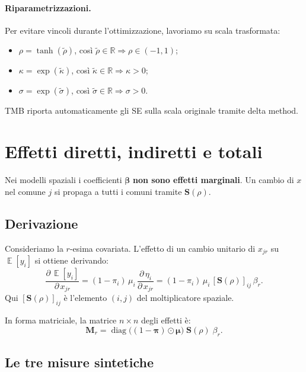 \documentclass[12pt,a4paper]{article}
\newcommand{\bS}{\mathbf{S}}
\DeclareMathOperator{\E}{\mathbb{E}}
\DeclareMathOperator{\diag}{diag}
\begin{document}
\paragraph{Riparametrizzazioni.}
Per evitare vincoli durante l'ottimizzazione, lavoriamo su scala trasformata:
\begin{itemize}
  \item $\rho = \tanh(\tilde{\rho})$, cos\`i $\tilde{\rho} \in \mathbb{R} \Rightarrow \rho \in (-1,1)$;
  \item $\kappa = \exp(\tilde{\kappa})$, cos\`i $\tilde{\kappa} \in \mathbb{R} \Rightarrow \kappa > 0$;
  \item $\sigma = \exp(\tilde{\sigma})$, cos\`i $\tilde{\sigma} \in \mathbb{R} \Rightarrow \sigma > 0$.
\end{itemize}
TMB riporta automaticamente gli SE sulla scala originale tramite delta method.

\section{Effetti diretti, indiretti e totali}

Nei modelli spaziali i coefficienti $\boldsymbol{\beta}$ \textbf{non sono effetti marginali}. Un cambio di $x$ nel comune $j$ si propaga a tutti i comuni tramite $\bS(\rho)$.

\subsection{Derivazione}

Consideriamo la $r$-esima covariata. L'effetto di un cambio unitario di $x_{jr}$ su $\E[y_i]$ si ottiene derivando:
\[
  \frac{\partial\,\E[y_i]}{\partial\,x_{jr}}
  = (1 - \pi_i)\,\mu_i\,\frac{\partial\,\eta_i}{\partial\,x_{jr}}
  = (1 - \pi_i)\,\mu_i\,[\bS(\rho)]_{ij}\,\beta_r.
\]
Qui $[\bS(\rho)]_{ij}$ \`e l'elemento $(i,j)$ del moltiplicatore spaziale.

In forma matriciale, la matrice $n \times n$ degli effetti \`e:
\[
  \mathbf{M}_r = \diag\bigl((1 - \boldsymbol{\pi}) \odot \boldsymbol{\mu}\bigr)\;\bS(\rho)\;\beta_r.
\]

\subsection{Le tre misure sintetiche}
\end{document}
